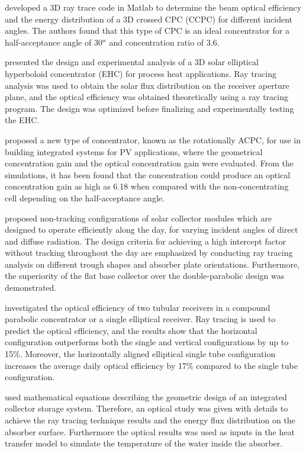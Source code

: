 \citet{Sellami2013} developed a 3D ray trace code in Matlab to determine the beam optical efficiency and the energy distribution of a 3D crossed CPC (CCPC) for different incident angles. The authors found that this type of CPC is an ideal concentrator for a half-acceptance angle of 30$^{\rm{o}}$ and concentration ratio of 3.6.

\citet{Ali2014} presented the design and experimental analysis of a 3D solar elliptical hyperboloid concentrator (EHC) for process heat applications. Ray tracing analysis was used to obtain the solar flux distribution on the receiver aperture plane, and the optical efficiency was obtained theoretically using a ray tracing program. The design was optimized before finalizing and experimentally testing the EHC.

\citet{Abu-Bakar2014} proposed a new type of concentrator, known as the  rotationally ACPC, for use in building integrated systems for PV applications, where the geometrical concentration gain and the optical concentration gain were evaluated. From the simulations, it has been found that the concentration could produce an optical concentration gain as high as 6.18 when compared with the non-concentrating cell depending on the half-acceptance angle.

\citet{Ratismith2014} proposed non-tracking configurations of solar collector modules which are designed to operate efficiently along the day, for varying incident angles of direct and diffuse radiation. The design criteria for achieving a high intercept factor without tracking throughout the day are emphasized by conducting ray tracing analysis on different trough shapes and absorber plate orientations. Furthermore, the superiority of the flat base collector over the double-parabolic design was demonstrated.

\citet{Abdullahi2015} investigated the optical efficiency of two tubular receivers in a compound parabolic concentrator or a single elliptical receiver. Ray tracing is used to predict the optical efficiency, and the results show that the horizontal configuration outperforms both the single and vertical configurations by up to 15\%. Moreover, the horizontally aligned elliptical single tube configuration increases the average daily optical efficiency by 17\% compared to the single tube configuration.

\citet{Benrejeb2015} used mathematical equations describing the geometric design of an integrated collector storage system. Therefore, an optical study was given with details to achieve the ray tracing technique results and the energy flux distribution on the absorber surface. Furthermore the optical results was used as inputs in the heat transfer model to simulate the temperature of the water inside the absorber.

